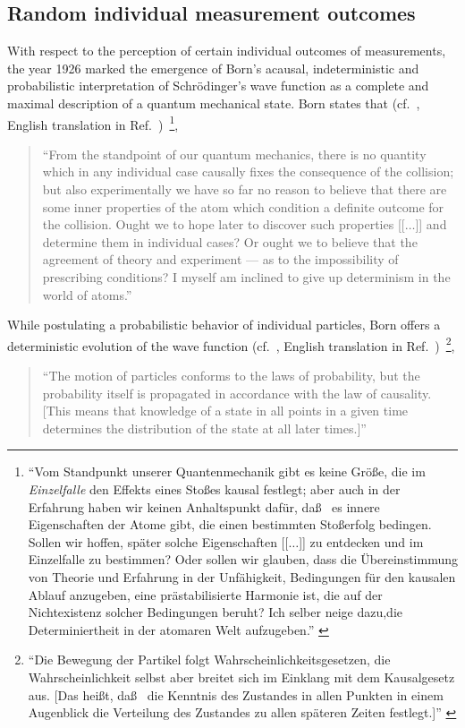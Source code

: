 \documentclass[%
 preprint,
 showpacs,
 showkeys,
 preprintnumbers,
 amsmath,amssymb,
 aps,
 prl,
  longbibliography,
 ]{revtex4-1}
\begin{document}
\subsection{Random individual measurement outcomes}

With respect to the perception of certain individual outcomes of measurements,
the year 1926 marked the emergence of Born's acausal, indeterministic and
probabilistic interpretation of
Schr\"odinger's wave function as a complete and maximal description of a quantum mechanical state.
Born states that (cf.~\cite[p.~866]{born-26-1}, English translation in Ref.~\cite[p.~54]{wheeler-Zurek:83})~\footnote{
{ ``Vom Standpunkt unserer Quantenmechanik gibt es keine Gr\"o\ss e, die im {\em Einzelfalle} den Effekts eines Sto\ss es
kausal festlegt; aber auch in der Erfahrung haben wir keinen Anhaltspunkt daf\"ur, da\ss~ es innere Eigenschaften
der Atome gibt, die einen bestimmten Sto\ss erfolg bedingen.
Sollen wir hoffen, sp\"ater solche Eigenschaften
[[$\ldots$]] zu entdecken und im Einzelfalle zu bestimmen?
Oder sollen wir glauben, dass die \"Ubereinstimmung von Theorie und Erfahrung
in der Unf\"ahigkeit, Bedingungen f\"ur den kausalen Ablauf anzugeben, eine pr\"astabilisierte Harmonie ist,
die auf der Nichtexistenz solcher Bedingungen beruht?
Ich selber neige dazu,die Determiniertheit in der atomaren Welt aufzugeben.''
}
},
\begin{quote}
{  ``From the standpoint of our quantum mechanics, there is no quantity
which in any individual case causally fixes the consequence of the collision;
but also experimentally we have so far no reason to believe that there are some inner properties of the atom
which condition a definite outcome for the collision.
Ought we to hope later to discover such properties [[$\ldots$]]  and determine them in individual cases?
Or ought we to believe that the agreement of theory and experiment --- as to the impossibility
of prescribing conditions? I myself am inclined to give up determinism in the world of atoms.''
}
\end{quote}
While postulating a probabilistic behavior of individual particles,
Born offers a deterministic evolution of the wave function
(cf.~\cite[p.~804]{born-26-2}, English translation in Ref.~\cite[p.~302]{jammer:89})~\footnote{
{  ``Die Bewegung der Partikel folgt Wahrscheinlichkeitsgesetzen,
die Wahrscheinlichkeit selbst aber breitet sich im Einklang mit dem Kausalgesetz  aus.
[Das hei\ss t, da\ss~ die Kenntnis des Zustandes in allen Punkten in einem Augenblick
die Verteilung des Zustandes zu allen sp{\"a}teren Zeiten festlegt.]''
}
},
\begin{quote}
{  ``The motion of particles conforms to the laws of probability, but the probability itself
is propagated in accordance with the law of causality.
[This means that knowledge of a state in all points in a given time determines the distribution of
the state at all later times.]''
}
\end{quote}
\end{document}

